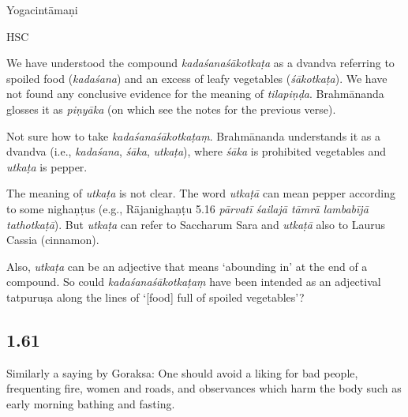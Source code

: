 \begin{ekdosis}
\begin{sources}[hp01_060]
\end{sources}

\begin{testimonia}[hp01_060]
Yogacintāmaṇi

\begin{versinnote}
\end{versinnote}

HSC

\begin{versinnote}
\end{versinnote}

\end{testimonia}

\begin{philcomm}[hp01_060]
We have understood the compound \emph{kadaśanaśākotkaṭa} as a dvandva referring to spoiled food (\emph{kadaśana}) and an excess of leafy vegetables (\emph{śākotkaṭa}).
We have not found any conclusive evidence for the meaning of \emph{tilapiṇḍa}. Brahmānanda glosses it as \emph{piṇyāka} (on which see the notes for the previous verse).

Not sure how to take \emph{kadaśanaśākotkaṭaṃ}. Brahmānanda understands it as a dvandva (i.e., \emph{kadaśana}, \emph{śāka}, \emph{utkaṭa}), where \emph{śāka} is prohibited vegetables and \emph{utkaṭa} is pepper.

The meaning of \emph{utkaṭa} is not clear. The word \emph{utkaṭā} can mean pepper according to some nighaṇṭus (e.g., Rājanighaṇṭu 5.16 \emph{pārvatī śailajā tāmrā lambabījā tathotkaṭā}). But \emph{utkaṭa} can refer to Saccharum Sara and \emph{utkaṭā} also to Laurus Cassia (cinnamon).

Also, \emph{utkaṭa} can be an adjective that means ‘abounding in’ at the end of a compound. So could \emph{kadaśanaśākotkaṭaṃ} have been intended as an adjectival tatpuruṣa along the lines of ‘[food] full of spoiled vegetables’?
\end{philcomm}

\subsection*{1.61}
\begin{translation}[hp01_061]
Similarly a saying by Goraksa:
One should avoid a liking for bad people, frequenting fire, women and roads, and observances which harm the body such as early morning bathing and fasting.
\end{translation}


\end{ekdosis}
